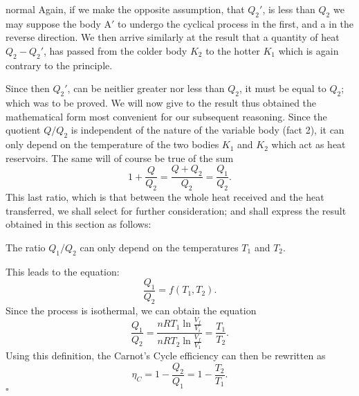 \begin{solution}{normal}
Again, if we make the opposite assumption, that $Q_2'$, is less than $Q_2$ we may suppose the body $\text{A}'$ to undergo the cyclical process in the first, and a in the reverse direction. We then arrive similarly at the result that a quantity of heat $Q_2- Q_2'$, has passed from the colder body $K_2$ to the hotter $K_1$ which is again contrary to the principle.
\vspace{3mm}

Since then $Q_2'$, can be neitlier greater nor less than $Q_2$, it must be equal to $Q_2$; which was to be proved. We will now give to the result thus obtained the mathematical form most convenient for our subsequent reasoning. Since the quotient $Q/Q_2$ is independent of the nature of the variable body (fact 2), it can only depend on the temperature of the two bodies $K_1$ and $K_2$ which act as heat reservoirs. The same will of course be true of the sum
\[1 + \frac{Q}{Q_2} = \frac{Q + Q_2}{Q_2} = \frac{Q_1}{Q_2}.\]
This last ratio, which is that between the whole heat received and the heat transferred, we shall select for further consideration; and shall express the result obtained in this section as follows: \vspace{3mm}

The ratio $Q_1/Q_2$ can only depend on the temperatures $T_1$ and $T_2$.
\vspace{3mm}

This leads to the equation:
\[\frac{Q_1}{Q_2} = f(T_1, T_2).\]
Since the process is isothermal, we can obtain the equation
\[\frac{Q_1}{Q_2} = \dfrac{nRT_1\ln \frac{V_f}{V_i}}{nRT_2 \ln \frac{V_f}{V_1}} = \frac{T_1}{T_2}.\]
Using this definition, the Carnot's Cycle efficiency can then be rewritten as 
\[\eta_C = 1 - \frac{Q_2}{Q_1} = 1 - \frac{T_2}{T_1}.\]
$\square$
\end{solution}